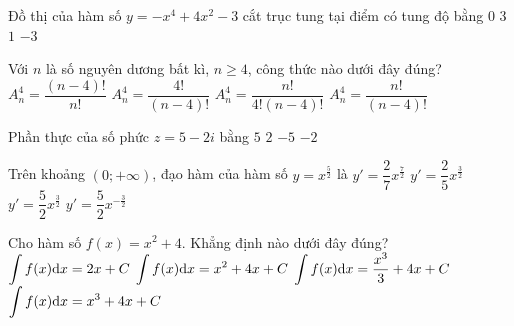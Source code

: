\begin{ex}%
{\vspace{-0.5cm}
}

\end{ex}
\begin{ex}%
Đồ thị của hàm số $y=-x^4+4 x^2-3$ cắt trục tung tại điểm có tung độ bằng
\choice
{$0$}
{$3$}
{$1$}
{\True $-3$}

\end{ex}
\begin{ex}%
Với $n$ là số nguyên dương bất kì, $n \geq 4$, công thức nào dưới đây đúng?
\choice
{$A_n^4=\dfrac{(n-4) !}{n !}$}
{$A_n^4=\dfrac{4!}{(n-4) !}$}
{$A_n^4=\dfrac{n !}{4!(n-4) !}$}
{\True $A_n^4=\dfrac{n !}{(n-4) !}$}

\end{ex}
\begin{ex}%
Phần thực của số phức $z=5-2 i$ bằng
\choice
{\True $5$}
{$2$}
{$-5$}
{$-2$}

\end{ex}
\begin{ex}%
Trên khoảng $(0;+\infty)$, đạo hàm của hàm số $y=x^{\frac{5}{2}}$ là
\choice
{$y'=\dfrac{2}{7} x^{\frac{7}{2}}$}
{$y'=\dfrac{2}{5} x^{\frac{3}{2}}$}
{\True $y'=\dfrac{5}{2} x^{\frac{3}{2}}$}
{$y'=\dfrac{5}{2} x^{-\frac{3}{2}}$}

\end{ex}
\begin{ex}%
Cho hàm số $f(x)=x^2+4$. Khẳng định nào dưới đây đúng?
\choice
{$\displaystyle\displaystyle\int f(x) \mathrm{d} x=2 x+C$}
{$\displaystyle\displaystyle\int f(x) \mathrm{d} x=x^2+4 x+C$}
{\True $\displaystyle\displaystyle\int f(x) \mathrm{d} x=\dfrac{x^3}{3}+4 x+C$}
{$\displaystyle\displaystyle\int f(x) \mathrm{d} x=x^3+4 x+C$}

\end{ex}

